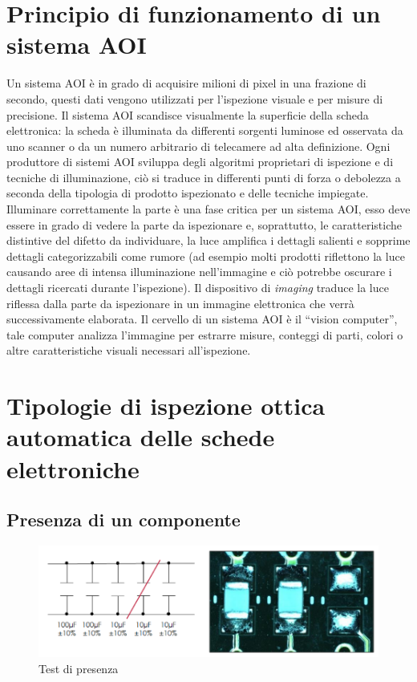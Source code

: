 \section {Principio di funzionamento di un sistema AOI}

Un sistema AOI è in grado di acquisire milioni di pixel in una frazione di secondo, questi dati vengono
utilizzati per l'ispezione visuale e per misure di precisione.
Il sistema AOI scandisce visualmente la superficie della scheda elettronica: la scheda è illuminata da
differenti sorgenti luminose ed osservata da uno scanner o da un numero arbitrario di telecamere ad alta
definizione. Ogni produttore di sistemi AOI sviluppa degli algoritmi proprietari di ispezione e di tecniche
di illuminazione, ciò si traduce in differenti punti di forza o debolezza a seconda della tipologia di
prodotto ispezionato e delle tecniche impiegate.
Illuminare correttamente la parte è una fase critica per un sistema AOI, esso deve essere in grado di
vedere la parte da ispezionare e, soprattutto, le caratteristiche distintive del difetto da individuare, la luce amplifica i dettagli salienti e sopprime dettagli categorizzabili come rumore (ad esempio molti prodotti
riflettono la luce causando aree di intensa illuminazione nell'immagine e ciò potrebbe oscurare i dettagli
ricercati durante l'ispezione).
Il dispositivo di \emph{imaging} traduce la luce riflessa dalla parte da ispezionare in un immagine elettronica che
verrà successivamente elaborata.
Il cervello di un sistema AOI è il “vision computer”, tale computer analizza l'immagine per estrarre misure,
conteggi di parti, colori o altre caratteristiche visuali necessari all'ispezione.

\section {Tipologie di ispezione ottica automatica delle schede elettroniche}

\subsection{Presenza di un componente}

\begin{figure}[!ht]
\centering
\includegraphics[width=.8\textwidth]{img/presenza-componente.png}
\caption{Test di presenza}
\label{fig:presenza}
\end{figure}


